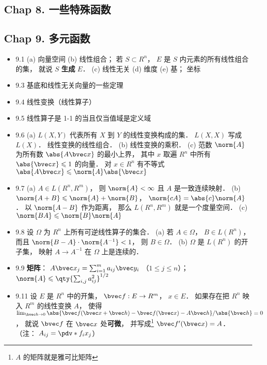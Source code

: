 \subsection{Chap 8. 一些特殊函数}

\subsection{Chap 9. 多元函数}

\begin{itemize}
\item 9.1 (a) 向量空间 (b) 线性组合； 若 $S \subset R^n$， $E$ 是 $S$ 内元素的所有线性组合的集， 就说 $S$ \textbf{生成} $E$． (c) 线性无关 (d) 维度 (e) 基； 坐标

\item 9.3 基底和线性无关向量的一些定理

\item 9.4 线性变换（线性算子）

\item 9.5 线性算子是 1-1 的当且仅当值域是定义域

\item 9.6 (a) $L(X,Y)$ 代表所有 $X$ 到 $Y$ 的线性变换构成的集． $L(X,X)$ 写成 $L(X)$． 线性变换的线性组合． (b) 线性变换的乘积． (c) 范数 $\norm{A}$ 为所有数 $\abs{A\bvec x}$ 的最小上界， 其中 $x$ 取遍 $R^n$ 中所有 $\abs{\bvec x}\leqslant 1$ 的向量． 对 $x\in R^n$ 有不等式 $\abs{A\bvec x}\leqslant \norm{A}\abs{\bvec x}$

\item 9.7 (a) $A\in L(R^n,R^m)$， 则 $\norm{A}<\infty$ 且 $A$ 是一致连续映射． (b) $\norm{A+B}\leqslant \norm{A}+\norm{B}$， $\norm{cA} = \abs{c}\norm{A}$． 以 $\norm{A-B}$ 作为距离， 那么 $L(R^n,R^m)$ 就是一个度量空间． (c) $\norm{BA} \leqslant \norm{B}\norm{A}$

\item 9.8 设 $\Omega$ 为 $R^n$ 上所有可逆线性算子的集合． (a) 若 $A\in\Omega$， $B\in L(R^n)$， 而且 $\norm{B-A}\cdot\norm{A^{-1}}<1$， 则 $B\in \Omega$． (b) $\Omega$ 是 $L(R^n)$ 的开子集， 映射 $A\to A^{-1}$ 在 $\Omega$ 上是连续的．

\item 9.9 \textbf{矩阵}： $A\bvec x_j = \sum_{i=1}^m a_{ij}\bvec y_i$ （$1\leqslant j\leqslant n$）； $\norm{A}\leqslant \qty{\sum_{i,j}a_{ij}^2}^{1/2}$

\item 9.11 设 $E$ 是 $R^n$ 中的开集， $\bvec f: E\to R^m$， $x\in E$． 如果存在把 $R^n$ 映入 $R^m$ 的线性变换 $A$， 使得 $\lim_{\bvec h\to 0} \abs{\bvec f(\bvec x+\bvec h) - \bvec f(\bvec x) - A\bvec h}/{\abs{\bvec h}} = 0$， 就说 $\bvec f$ 在 $\bvec x$ 处\textbf{可微}， 并写成\footnote{$A$ 的矩阵就是雅可比矩阵} $\bvec f'(\bvec x) = A$． （注： $A_{ij} = \pdv*{f_i}{x_j}$）


\end{itemize}
